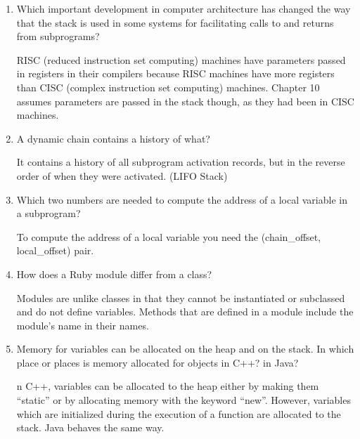 \begin{enumerate}
  \item Which important development in computer architecture
    has changed the way that the stack is used in some
    systems for facilitating calls to and returns from
    subprograms?

  \begin{answer}
    RISC (reduced instruction set computing) machines have parameters passed in registers in their compilers because RISC machines have more registers than CISC (complex instruction set computing) machines. Chapter 10 assumes parameters are passed in the stack though, as they had been in CISC machines.
  \end{answer}

  \item A dynamic chain contains a history of what?

  \begin{answer}
    It contains a history of all subprogram activation records, but in the reverse order of when they were activated. (LIFO Stack)
  \end{answer}

  \item Which two numbers are needed to compute
    the address of a local variable in a subprogram?

  \begin{answer}
  To compute the address of a local variable you need the (chain_offset, local_offset) pair.
  \end{answer}

  \item How does a Ruby module differ from a class?

  \begin{answer}
  Modules are unlike classes in that they cannot be instantiated or subclassed
  and do not define variables. Methods that are defined in a module include the
  module’s name in their names.
  \end{answer}

  \item Memory for variables can be allocated on the heap
    and on the stack. In which place or places is memory
    allocated for objects in C++? in Java?

  \begin{answer}
  n C++, variables can be allocated to the heap either by making them “static” or by allocating memory with the keyword “new”. However, variables which are initialized during the execution of a function are allocated to the stack. Java behaves the same way. 
  \end{answer}


\end{enumerate}
